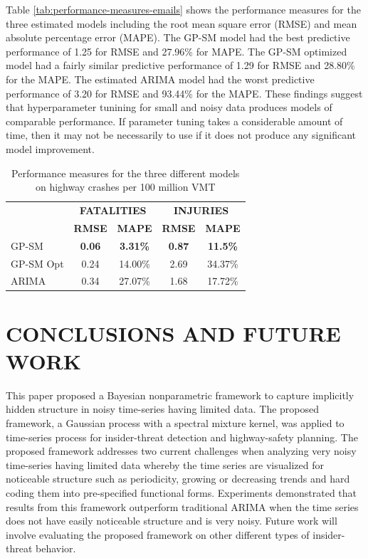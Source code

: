 \documentclass[letterpaper]{article}
\begin{document}
Table \ref{tab:performance-measures-emails} shows the performance measures for the three estimated models including the root mean square error (RMSE) and mean absolute percentage error (MAPE). The GP-SM model had the best predictive performance of 1.25 for RMSE and 27.96\% for MAPE. The GP-SM optimized model had a fairly similar predictive performance of 1.29 for RMSE and 28.80\% for the MAPE. The estimated ARIMA model had the worst predictive performance of 3.20 for RMSE and 93.44\% for the MAPE. These findings suggest that hyperparameter tunining for small and noisy data produces models of comparable performance. If parameter tuning takes a considerable amount of time, then it may not be necessarily to use if it does not produce any significant model improvement.

\begin{table}[h]
\caption{Performance measures for the three different models on highway crashes per 100 million VMT}
\label{tab:performance-measures-crashes}
\begin{center}
\begin{tabular}{l@{\quad}cc@{\quad}cc}
  \toprule
  \multirow{2}{*}{\raisebox{-\heavyrulewidth}{\bf MODEL}} & \multicolumn{2}{c}{\bf FATALITIES} & \multicolumn{2}{c}{\bf INJURIES} \\
  \cmidrule{2-5}
  & {\bf RMSE} & {\bf MAPE} & {\bf RMSE} & {\bf MAPE} \\
  \midrule
  GP-SM & {\bf 0.06} & {\bf 3.31\%} & {\bf 0.87} & {\bf 11.5\%}  \\
  GP-SM Opt & 0.24 & 14.00\% & 2.69 & 34.37\%  \\
  ARIMA & 0.34 & 27.07\% & 1.68 & 17.72\%  \\
  \bottomrule
\end{tabular}
\end{center}
\end{table}


\section{CONCLUSIONS AND FUTURE WORK}\label{conclusions-and-future-work}
This paper proposed a Bayesian nonparametric framework to capture implicitly hidden structure in noisy time-series having limited data. The proposed framework, a Gaussian process with a spectral mixture kernel, was applied to time-series process for insider-threat detection and highway-safety planning. The proposed framework addresses two current challenges when analyzing very noisy time-series having limited data whereby the time series are visualized for noticeable structure such as periodicity, growing or decreasing trends and hard coding them into pre-specified functional forms. Experiments demonstrated that results from this framework outperform traditional ARIMA when the time series does not have easily noticeable structure and is very noisy. Future work will involve evaluating the proposed framework on other different types of insider-threat behavior. 
\end{document}

